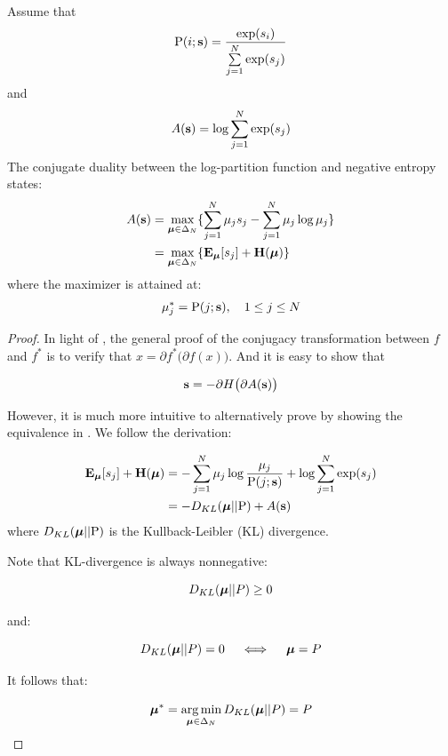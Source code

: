 \begin{lem} \label{lem::bk-cd}
  Assume that
  $$\mathrm{P}(i; \mathbf{s}) = \frac{\exp(s_i)}{\sum\limits_{j=1}^N \exp(s_j)}$$
  and
  $$A(\mathbf{s}) = \log \sum\limits_{j = 1}^N \exp(s_j)$$
  The conjugate duality between the log-partition function and negative entropy
  states:
  \begin{align}
    A(\mathbf{s}) &= \max\limits_{\boldsymbol{\mu} \in \Delta_N}
                    \{ \sum\limits_{j=1}^N \mu_j s_j -
                       \sum\limits_{j=1}^N \mu_j \log \mu_j \} \nonumber \\
           &= \max\limits_{\boldsymbol{\mu} \in \Delta_N}
                    \{ \mathbf{E}_{\boldsymbol{\mu}} [s_j] + \mathbf{H}(\boldsymbol{\mu}) \} \label{eq::bk-cd}
  \end{align}
  where the maximizer is attained at:
  \begin{align}
    \mu_j^* = \mathrm{P}(j; \mathbf{s}), \quad 1 \le j \le N \label{eq::bk-cd_sol}
  \end{align}
\end{lem}
\begin{proof}

  In light of , the general proof of the
  conjugacy transformation between $f$ and $f^*$ is to verify that $x = \partial
  f^* \big( \partial f(x) \big)$. And it is easy to show that

  $$\mathbf{s} = -\partial H \big(\partial A (\mathbf{s}) \big)$$

  However, it is much more intuitive to alternatively prove by showing the
  equivalence in . We follow the derivation:

  \begin{align*}
    \mathbf{E}_{\boldsymbol{\mu}}[s_j] + \mathbf{H}(\boldsymbol{\mu})
      &= -\sum\limits_{j=1}^N \mu_j \log \frac{\mu_j }{ \mathrm{P}(j; \mathbf{s}) } +
          \log\sum\limits_{j=1}^N \exp(s_j) \nonumber \\
      &= -D_{KL}(\boldsymbol{\mu} || \mathrm{P}) + A(\mathbf{s})
  \end{align*}
where $D_{KL}(\boldsymbol{\mu} || \mathrm{P})$ is the Kullback-Leibler (KL) divergence.

Note that KL-divergence is always nonnegative:

$$D_{KL}(\boldsymbol{\mu} || P) \ge 0$$

and:

$$D_{KL}(\boldsymbol{\mu} || P) = 0  \quad\iff\quad \boldsymbol{\mu} = P $$

It follows that:

$$\boldsymbol{\mu}^* = \operatorname*{arg\,min}\limits_{\boldsymbol{\mu} \in \Delta_N} D_{KL}(\boldsymbol{\mu} || P) = P$$

\end{proof}


